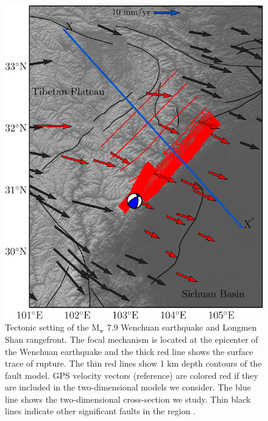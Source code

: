 \documentclass[draft,jgrga]{agutex}
\begin{document}
\begin{article}
\begin{figure}[h!]
    \centering
    \includegraphics{figs/lms_map_all.pdf}
    \caption{Tectonic setting of the $\textrm{M}_{\textrm{w}}$ 7.9 Wenchuan earthquake and Longmen Shan rangefront. The focal mechanism is located at the epicenter of the Wenchuan earthquake and the thick red line shows the surface trace of rupture. The thin red lines show 1 km depth contours of the fault model. GPS velocity vectors (reference) are colored red if they are included in the two-dimensional models we consider. The blue line shows the two-dimensional cross-section we study. Thin black lines indicate other significant faults in the region \citep{Taylor09}.}
    \label{fig:regional_map}
\end{figure}


\end{article}
\end{document}
